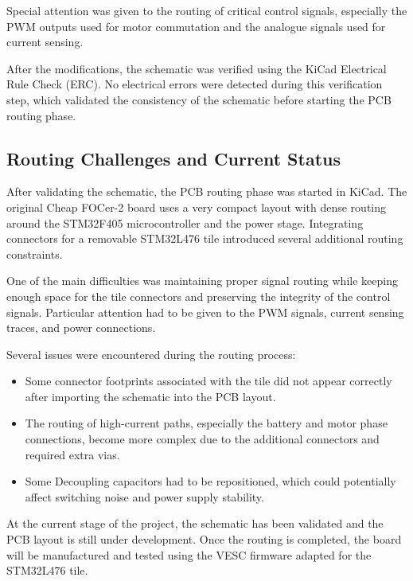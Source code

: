 Special attention was given to the routing of critical control signals, especially the PWM outputs used for motor commutation and the analogue signals used for current sensing.

After the modifications, the schematic was verified using the KiCad Electrical Rule Check (ERC). No electrical errors were detected during this verification step, which validated the consistency of the schematic before starting the PCB routing phase.

\subsection{Routing Challenges and Current Status}

After validating the schematic, the PCB routing phase was started in KiCad. The original Cheap FOCer-2 board uses a very compact layout with dense routing around the STM32F405 microcontroller and the power stage. Integrating connectors for a removable STM32L476 tile introduced several additional routing constraints.

One of the main difficulties was maintaining proper signal routing while keeping enough space for the tile connectors and preserving the integrity of the control signals. Particular attention had to be given to the PWM signals, current sensing traces, and power connections.

Several issues were encountered during the routing process:
\begin{itemize}
    \item Some connector footprints associated with the tile did not appear correctly after importing the schematic into the PCB layout.
    \item The routing of high-current paths, especially the battery and motor phase connections, become more complex due to the additional connectors and required extra vias.
    \item Some Decoupling capacitors had to be repositioned, which could potentially affect switching noise and power
     supply stability.
\end{itemize}

At the current stage of the project, the schematic has been validated and the PCB layout is still under development. Once the routing is completed, the board will be manufactured and tested using the VESC firmware adapted for the STM32L476 tile.
